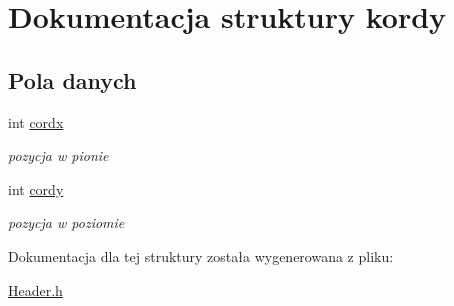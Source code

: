 \hypertarget{structkordy}{}\section{Dokumentacja struktury kordy}
\label{structkordy}
\subsection*{Pola danych}
\begin{DoxyCompactItemize}
\item 
\mbox{\label{structkordy_a60f7574e937e6eb92881573460342c1a}} 
int \mbox{\hyperlink{structkordy_a60f7574e937e6eb92881573460342c1a}{cordx}}
\begin{DoxyCompactList}\small\item\em pozycja w pionie \end{DoxyCompactList}\item 
\mbox{\label{structkordy_ab59a0e239ad67340d5b90320d1fe69b3}} 
int \mbox{\hyperlink{structkordy_ab59a0e239ad67340d5b90320d1fe69b3}{cordy}}
\begin{DoxyCompactList}\small\item\em pozycja w poziomie \end{DoxyCompactList}\end{DoxyCompactItemize}


Dokumentacja dla tej struktury została wygenerowana z pliku\+:\begin{DoxyCompactItemize}
\item 
\mbox{\hyperlink{_header_8h}{Header.\+h}}\end{DoxyCompactItemize}
